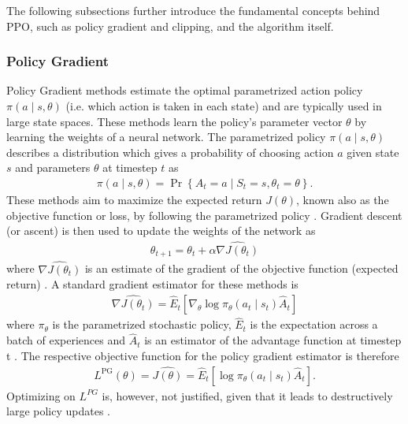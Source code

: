 The following subsections further introduce the fundamental concepts behind PPO, such as policy gradient and clipping, and the algorithm itself.





\subsubsection{Policy Gradient}
Policy Gradient methods estimate the optimal parametrized action policy $\pi(a \mid s, \theta)$ (i.e. which action is taken in each state) and are typically used in large state spaces. These methods learn the policy's parameter vector $\theta$ by learning the weights of a neural network. 
The parametrized policy $\pi(a \mid s, \theta)$ describes a distribution which gives a probability of choosing action $a$ given state $s$ and parameters $\theta$ at timestep $t$ as
\begin{gather}
    \pi(a \mid s, \theta)=\operatorname{Pr}\left\{A_{t}=a \mid S_{t}=s, \theta_{t}=\theta\right\}.
    \label{eu_policy_gradient}
\end{gather}
These methods aim to maximize the expected return $J(\theta)$, known also as the objective function or loss, by following the parametrized policy \cite{sutton2018reinforcement}. Gradient descent (or ascent) is then used to update the weights of the network as
\begin{gather}
   \theta_{t+1}=\theta_{t}+\alpha \widehat{\nabla J\left(\theta_{t}\right)}
   \label{eu_policy_gradient_update_weiights}
\end{gather}
where $\widehat{\nabla J\left(\theta_{t}\right)}$ is an estimate of the gradient of the objective function (expected return) \cite{3}. A standard gradient estimator for these methods is
\begin{gather}
    \widehat{\nabla J\left(\theta_{t}\right)}=\hat{E}_{t}\left[\nabla_{\theta} \log \pi_{\theta}\left(a_{t} \mid s_{t}\right) \hat{A}_{t}\right]
    \label{eu_policy_gradient_estimator}
\end{gather}
where $\pi_{\theta}$ is the parametrized stochastic policy, $\hat{E}_{t}$ is the expectation across a batch of experiences and $\hat{A}_{t}$ is an estimator of the advantage function at timestep t \cite{sutton2018reinforcement}. 
The respective objective function for the policy gradient estimator is therefore
\begin{gather}
  L^{\mathrm{PG}}(\theta)=\widehat{J(\theta)}=\hat{E}_{t}\left[\log \pi_{\theta}\left(a_{t} \mid s_{t}\right) \hat{A}_{t}\right].
  \label{eu_policy_gradient_obj_function}
\end{gather}
Optimizing on $L^{P G}$ is, however, not justified, given that it leads to destructively large policy updates \cite{schulman2017proximal}.

